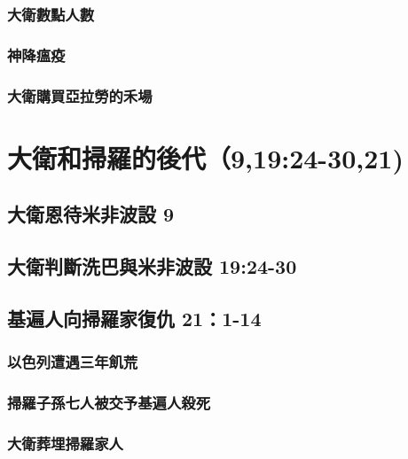 \subsubsection{大衛數點人數}
\subsubsection{神降瘟疫}
\subsubsection{大衛購買亞拉勞的禾場}

\section{大衛和掃羅的後代（9,19:24-30,21)}


\subsection{大衛恩待米非波設 9}
\subsection{大衛判斷洗巴與米非波設 19:24-30}

\subsection{基遍人向掃羅家復仇 21：1-14}
\subsubsection{以色列遭遇三年飢荒}
\subsubsection{掃羅子孫七人被交予基遍人殺死}
\subsubsection{大衛葬埋掃羅家人}



